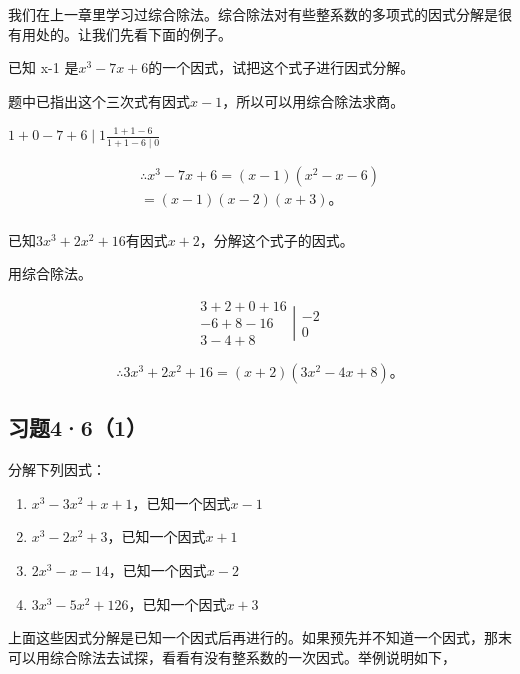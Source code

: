 我们在上一章里学习过综合除法。综合除法对有些整系数的多项式的因式分解是很有用处的。让我们先看下面的例子。

 已知 x-1
是\(x^{3}-7x+6\)的一个因式，试把这个式子进行因式分解。

题中已指出这个三次式有因式\(x - 1\)，所以可以用综合除法求商。

\(1 + 0 - 7 + 6 \mid 1\)\(\frac{1 + 1 - 6}{1 + 1 - 6 \mid 0}\)

\[
\begin{array}{l} \therefore x ^{3} - 7 x + 6 = (x - 1) \left(x ^{2} - x - 6\right) \\ = (x - 1) (x - 2) (x + 3)\text{。} \\ \end{array}
\]

已知\(3x^{3} + 2x^{2} + 16\)有因式\(x + 2\)，分解这个式子的因式。

 用综合除法。

\[
\begin{array}{c} 3 + 2 + 0 + 16 \\ - 6 + 8 - 16 \\ \hline 3 - 4 + 8 \end{array} \left| \begin{array}{c} - 2 \\ 0 \end{array} \right.
\]

\[
\therefore 3 x ^{3} + 2 x ^{2} + 16 = (x + 2) (3 x ^{2} - 4 x + 8)\text{。}
\]

\subsection{习题4·6（1）}

分解下列因式：

\begin{enumerate}[start=1]
\item
  \(x^{3} - 3x^{2} + x + 1\)，已知一个因式\(x - 1\)
\item
  \(x^{3} - 2x^{2} + 3\)，已知一个因式\(x + 1\)
\item
  \(2x^{3} - x - 14\)，已知一个因式\(x - 2\)
\item
  \(3x^{3} - 5x^{2} + 126\)，已知一个因式\(x + 3\)
\end{enumerate}

上面这些因式分解是已知一个因式后再进行的。如果预先并不知道一个因式，那末可以用综合除法去试探，看看有没有整系数的一次因式。举例说明如下，

